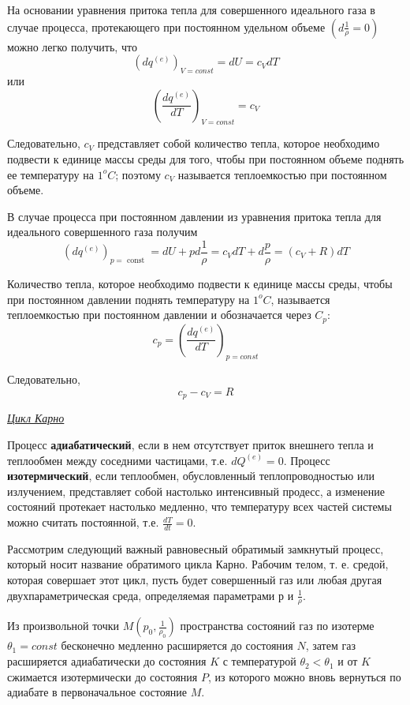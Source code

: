 На основании уравнения притока тепла для совершенного идеального газа в случае процесса, протекающего при постоянном удельном объеме $\left(\displaystyle d\frac{1}{\rho}=0\right)$ можно легко получить, что
$$ (dq^{(e)})_{V = const} = dU = c_VdT $$
или
$$ \left( \frac{dq^{(e)}}{dT} \right)_{V=const} = c_V $$

Следовательно,  $c_V$ представляет собой количество тепла, которое необходимо подвести к единице массы среды для того, чтобы при постоянном объеме поднять ее температуру на $1^oC$;  поэтому $c_V$ называется теплоемкостью при постоянном объеме.

В случае процесса при постоянном давлении из уравнения притока тепла для идеального совершенного газа получим
$$ \left(d q^{(e)}\right)_{p=\text { const }}=d U+p d \frac{1}{\rho}=c_V d T+d \frac{p}{\rho}=\left(c_V+R\right) d T $$

Количество тепла, которое необходимо подвести к единице массы среды, чтобы при постоянном давлении поднять температуру на $1^oC$, называется теплоемкостью при постоянном давлении и обозначается через $C_p$:
$$ c_p = \left( \frac{dq^{(e)}}{dT} \right)_{p=const} $$

Следовательно, $$ c_p - c_V = R $$


\begin{center}
  \textit{\underline{Цикл Карно}}
\end{center}

Процесс \textbf{адиабатический}, если в нем отсутствует приток внешнего тепла и теплообмен между соседними частицами, т.е. $\displaystyle dQ^{(e)} = 0$.
Процесс \textbf{изотермический}, если теплообмен, обусловленный теплопроводностью или излучением, представляет собой настолько интенсивный продесс, а изменение состояний протекает настолько медленно, что температуру всех частей системы можно считать постоянной, т.е. $\displaystyle \frac{dT}{dt} = 0$.

Рассмотрим следующий важный равновесный обратимый замкнутый процесс, который носит название обратимого цикла Карно. Рабочим телом, т. е. средой, которая совершает этот цикл, пусть будет совершенный газ или любая другая двухпараметрическая среда, определяемая параметрами р и $\frac{1}{\rho}$.

Из произвольной точки $M (p_0, \frac{1}{\rho_0})$ пространства состояний газ по изотерме $\theta_1 = const$ бесконечно медленно расширяется до состояния $N$, затем газ расширяется адиабатически до состояния $K$ с  температурой $\theta_2 < \theta_1$ и от $K$ сжимается изотермически до состояния $P$, из которого можно вновь вернуться по адиабате в первоначальное состояние $M$.


